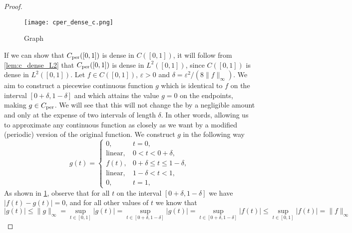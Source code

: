 \documentclass[../thesis.tex]{subfiles}
\begin{document}
\begin{proof}
    \begin{figure}
        \centering
        \texttt{[image: cper\_dense\_c.png]}
        \caption{Graph}
        \label{fig:g_periodic_close_to_f}
    \end{figure}
    If we can show that $C_{\text{per}}([0,1])$ is dense in $C([0,1])$, it will follow from \cref{lem:c_dense_L2} that $C_{\text{per}}([0,1])$ is dense in $L^2([0,1])$, since $C([0,1])$ is dense in $L^2([0,1])$. Let $f \in C([0,1])$, $\varepsilon>0$ and $\delta = \varepsilon^2/(8\|f\|_\infty)$. We aim to construct a piecewise continuous function $g$ which is identical to $f$ on the interval $[0+\delta,1-\delta ]$ and which attains the value $g = 0$ on the endpoints, making $g\in C_{\text{per}}$. We will see that this will not change the \Ltwonorm \space by a negligible amount and only at the expense of two intervals of length $\delta$. In other words, allowing us to approximate any continuous function as closely as we want by a modified (periodic) version of the original function. We construct $g$ in the following way
    \begin{equation*} %
        g(t) = 
        \begin{cases} 0, &  t=0,\\  
            \text{linear}, &  0<t<0+\delta,\\ 
            f(t), & 0+\delta \leq t \leq 1-\delta,\\ 
            \text{linear}, &  1-\delta <t<1,\\ 
            0, &  t=1,
        \end{cases}
    \end{equation*} 
    As shown in \cref{fig:g_periodic_close_to_f}, observe that for all $t$ on the interval $[0+\delta, 1-\delta]$ we have $|f(t)-g(t)|= 0$, and for all other values of $t$ we know that
    \begin{equation*}
        |g(t)| \leq \|g\|_{\infty} = \sup_{t\in[0,1]} |g(t)| = \sup_{t\in[0+\delta, 1-\delta]} |g(t)| = \sup_{t\in[0+\delta, 1-\delta]} |f(t)| \leq \sup_{t\in[0, 1]} |f(t)| =\| f\|_{\infty}

\end{equation*}
\end{proof}
\end{document}
